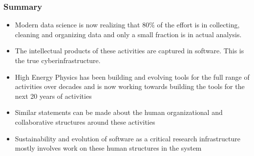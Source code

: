 \begin{frame}
\frametitle{Summary}
\begin{itemize}
\item Modern data science is now realizing that 80\% of the effort is in collecting, cleaning and organizing data and only a small fraction is in actual analysis.
\item The intellectual products of these activities are captured in software. This is the true cyberinfrastructure.
\item High Energy Physics has been building and evolving tools for the full range of activities over decades and is now working towards building the tools for the next 20 years of activities
\item Similar statements can be made about the human organizational and collaborative structures around these activities
\item Sustainability and evolution of software as a critical research infrastructure mostly involves work on these human structures in the system
\end{itemize}

\end{frame}



